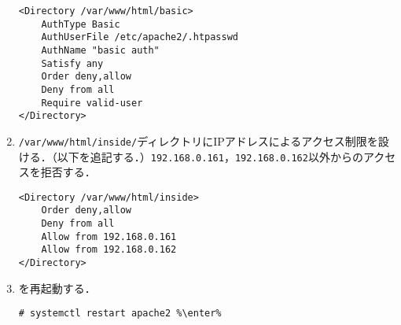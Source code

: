 \documentclass{jlreq}
\begin{document}
\begin{enumerate}
\begin{lstlisting}[style=file,caption={\ttfamily /etc/apache2/sites-available/000-default.conf},label={src:basic}]
<Directory /var/www/html/basic>
    AuthType Basic
    AuthUserFile /etc/apache2/.htpasswd
    AuthName "basic auth"
    Satisfy any
    Order deny,allow
    Deny from all
    Require valid-user
</Directory>
\end{lstlisting}
    \item \texttt{/var/www/html/inside/}ディレクトリにIPアドレスによるアクセス制限を設ける．（以下を追記する．）\texttt{192.168.0.161}，\texttt{192.168.0.162}以外からのアクセスを拒否する．
          \begin{lstlisting}[style=file,caption={\ttfamily /etc/apache2/sites-available/000-default.conf},label={src:inside}]
<Directory /var/www/html/inside>
    Order deny,allow
    Deny from all
    Allow from 192.168.0.161
    Allow from 192.168.0.162
</Directory>
    \end{lstlisting}
    \item \apache を再起動する．
          \begin{lstlisting}
# systemctl restart apache2 %\enter%
\end{lstlisting}
\end{enumerate}
\end{document}
